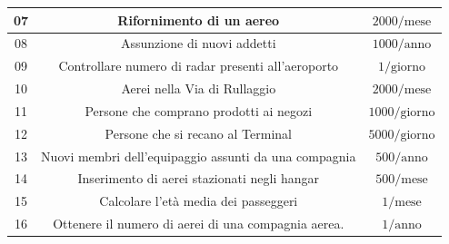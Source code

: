 \begin{tabular}{ | c c c |}
	
	
	
	
	\hline
	\textsf{\small 07} & \textsf{\small Rifornimento di un aereo} & \textsf{\small $ 2000/ \text{mese} $} \\
	\hline
	\textsf{\small 08} & \textsf{\small Assunzione di nuovi addetti} & \textsf{\small $ 1000 / \text{anno}$} \\
	\hline
	\textsf{\small 09} & \textsf{\small Controllare numero di radar presenti all'aeroporto} & \textsf{\small $ 1 / \text{giorno}$} \\
	\hline
	\textsf{\small 10} & \textsf{\small Aerei nella Via di Rullaggio} & \textsf{\small $ 2000 / \text{mese}$} \\
	\hline
	\textsf{\small 11} & \textsf{\small Persone che comprano prodotti ai negozi} & \textsf{\small $ 1000 / \text{giorno} $} \\ %
	\hline
	\textsf{\small 12} & \textsf{\small Persone che si recano al Terminal} & \textsf{\small $ 5000 / \text{giorno} $} \\
	\hline
	\textsf{\small 13} & \textsf{\small Nuovi membri dell'equipaggio assunti da una compagnia} & \textsf{\small $ 500 / \text{anno}$} \\ %
	\hline
	\textsf{\small 14} & \textsf{\small Inserimento di aerei stazionati negli hangar} & \textsf{\small $ 500 / \text{mese} $} \\ %
	\hline
	\textsf{\small 15} & \textsf{\small Calcolare l'età media dei passeggeri} & \textsf{\small $ 1 / \text{mese} $} \\
	\hline
	\textsf{\small 16} & \textsf{\small Ottenere il numero di aerei di una compagnia aerea.} & \textsf{\small $ 1 / \text{anno} $} \\

\end{tabular}
